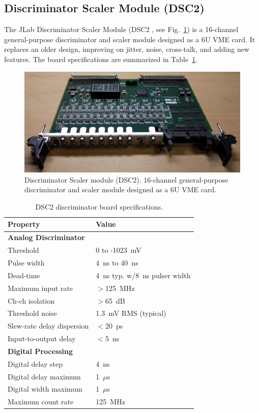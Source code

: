\subsection{Discriminator Scaler Module (DSC2)}

The JLab Discriminator Scaler Module (DSC2 \cite{dsc2-ref}, see Fig.~\ref{fig:dsc2_board}) is a 16-channel
general-purpose discriminator and scaler module designed as a 6U VME card. It replaces an older design, improving on
jitter, noise, cross-talk, and adding new features.  The board specifications are summarized in
Table~\ref{tab:dsc2_specifications}. 

\begin{figure}[hbt]
	\centering
	\includegraphics[width=1.0\columnwidth,keepaspectratio]{img/dsc2_board.png}
	\caption{Discriminator Scaler module (DSC2). 16-channel general-purpose discriminator and scaler module designed
          as a 6U VME card.}
	\label{fig:dsc2_board}
\end{figure}

\begin{table}
\begin{adjustbox}{width=\columnwidth,center}
	\begin{tabular}{| l | l |}
		\hline \hline
		Property			& Value				\\
		\hline
		{\bf Analog Discriminator}	&				\\
		Threshold			& 0 to -1023~mV			\\
		Pulse width			& 4~ns to 40~ns			\\
		Dead-time			& 4~ns typ. w/8~ns pulser width	\\
		Maximum input rate		& $>$125~MHz 			\\
		Ch-ch isolation			& $>$65~dB			\\
		Threshold noise			& 1.3~mV RMS (typical)		\\
		Slew-rate delay dispersion	& $<$20~ps			\\
		Input-to-output delay		& $<$5~ns			\\
		{\bf Digital Processing}	&				\\
		Digital delay step		& 4~ns				\\
		Digital delay maximum		& 1~$\mu$s				\\
		Digital width maximum		& 1~$\mu$s				\\
		Maximum count rate		& 125~MHz			\\
		\hline \hline
	\end{tabular}
\end{adjustbox}
\caption{DSC2 discriminator board specifications.}
\label{tab:dsc2_specifications}
\end{table}

